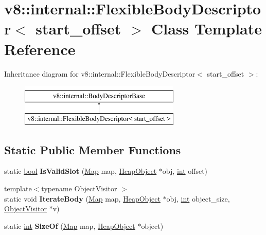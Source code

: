 \hypertarget{classv8_1_1internal_1_1FlexibleBodyDescriptor}{}\section{v8\+:\+:internal\+:\+:Flexible\+Body\+Descriptor$<$ start\+\_\+offset $>$ Class Template Reference}
\label{classv8_1_1internal_1_1FlexibleBodyDescriptor}
Inheritance diagram for v8\+:\+:internal\+:\+:Flexible\+Body\+Descriptor$<$ start\+\_\+offset $>$\+:\begin{figure}[H]
\begin{center}
\leavevmode
\includegraphics[height=2.000000cm]{classv8_1_1internal_1_1FlexibleBodyDescriptor}
\end{center}
\end{figure}
\subsection*{Static Public Member Functions}
\begin{DoxyCompactItemize}
\item 
\mbox{\label{classv8_1_1internal_1_1FlexibleBodyDescriptor_adfe30675da2eb9944f8b020cc2aa627f}} 
static \mbox{\hyperlink{classbool}{bool}} {\bfseries Is\+Valid\+Slot} (\mbox{\hyperlink{classv8_1_1internal_1_1Map}{Map}} map, \mbox{\hyperlink{classv8_1_1internal_1_1HeapObject}{Heap\+Object}} $\ast$obj, \mbox{\hyperlink{classint}{int}} offset)
\item 
\mbox{\label{classv8_1_1internal_1_1FlexibleBodyDescriptor_a710f2ba6054931679f1bbfc58866b429}} 
{\footnotesize template$<$typename Object\+Visitor $>$ }\\static void {\bfseries Iterate\+Body} (\mbox{\hyperlink{classv8_1_1internal_1_1Map}{Map}} map, \mbox{\hyperlink{classv8_1_1internal_1_1HeapObject}{Heap\+Object}} $\ast$obj, \mbox{\hyperlink{classint}{int}} object\+\_\+size, \mbox{\hyperlink{classv8_1_1internal_1_1ObjectVisitor}{Object\+Visitor}} $\ast$v)
\item 
\mbox{\label{classv8_1_1internal_1_1FlexibleBodyDescriptor_a48f68eb64905e54408730040f68a0647}} 
static \mbox{\hyperlink{classint}{int}} {\bfseries Size\+Of} (\mbox{\hyperlink{classv8_1_1internal_1_1Map}{Map}} map, \mbox{\hyperlink{classv8_1_1internal_1_1HeapObject}{Heap\+Object}} $\ast$object)
\end{DoxyCompactItemize}
